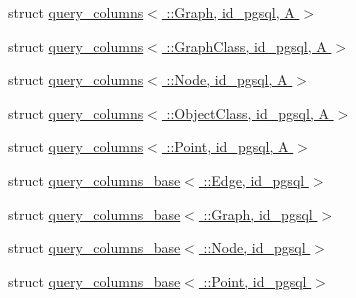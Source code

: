 \begin{DoxyCompactItemize}
struct \hyperlink{structodb_1_1query__columns_3_01_1_1_graph_00_01id__pgsql_00_01_a_01_4}{query\+\_\+columns$<$ \+::\+Graph, id\+\_\+pgsql, A $>$}
\item 
struct \hyperlink{structodb_1_1query__columns_3_01_1_1_graph_class_00_01id__pgsql_00_01_a_01_4}{query\+\_\+columns$<$ \+::\+Graph\+Class, id\+\_\+pgsql, A $>$}
\item 
struct \hyperlink{structodb_1_1query__columns_3_01_1_1_node_00_01id__pgsql_00_01_a_01_4}{query\+\_\+columns$<$ \+::\+Node, id\+\_\+pgsql, A $>$}
\item 
struct \hyperlink{structodb_1_1query__columns_3_01_1_1_object_class_00_01id__pgsql_00_01_a_01_4}{query\+\_\+columns$<$ \+::\+Object\+Class, id\+\_\+pgsql, A $>$}
\item 
struct \hyperlink{structodb_1_1query__columns_3_01_1_1_point_00_01id__pgsql_00_01_a_01_4}{query\+\_\+columns$<$ \+::\+Point, id\+\_\+pgsql, A $>$}
\item 
struct \hyperlink{structodb_1_1query__columns__base_3_01_1_1_edge_00_01id__pgsql_01_4}{query\+\_\+columns\+\_\+base$<$ \+::\+Edge, id\+\_\+pgsql $>$}
\item 
struct \hyperlink{structodb_1_1query__columns__base_3_01_1_1_graph_00_01id__pgsql_01_4}{query\+\_\+columns\+\_\+base$<$ \+::\+Graph, id\+\_\+pgsql $>$}
\item 
struct \hyperlink{structodb_1_1query__columns__base_3_01_1_1_node_00_01id__pgsql_01_4}{query\+\_\+columns\+\_\+base$<$ \+::\+Node, id\+\_\+pgsql $>$}
\item 
struct \hyperlink{structodb_1_1query__columns__base_3_01_1_1_point_00_01id__pgsql_01_4}{query\+\_\+columns\+\_\+base$<$ \+::\+Point, id\+\_\+pgsql $>$}
\end{DoxyCompactItemize}
